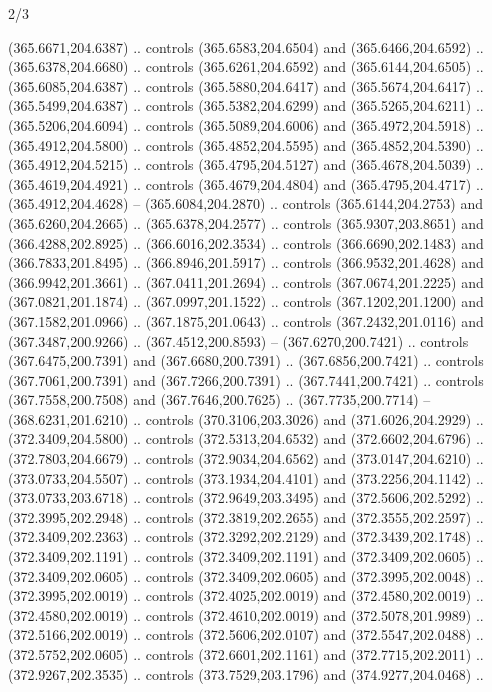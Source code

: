 \begin{flagdescription}{2/3}
\begin{scope}[xshift=0.5\flaglength,yshift=0.5\flagwidth,scale=\flagwidth/495.65]
\begin{scope}[y=0.8pt, x=0.8pt, yscale=-1,shift={(-463.76,-309.78)}]
  (365.6671,204.6387) .. controls (365.6583,204.6504) and (365.6466,204.6592) ..
  (365.6378,204.6680) .. controls (365.6261,204.6592) and (365.6144,204.6505) ..
  (365.6085,204.6387) .. controls (365.5880,204.6417) and (365.5674,204.6417) ..
  (365.5499,204.6387) .. controls (365.5382,204.6299) and (365.5265,204.6211) ..
  (365.5206,204.6094) .. controls (365.5089,204.6006) and (365.4972,204.5918) ..
  (365.4912,204.5800) .. controls (365.4852,204.5595) and (365.4852,204.5390) ..
  (365.4912,204.5215) .. controls (365.4795,204.5127) and (365.4678,204.5039) ..
  (365.4619,204.4921) .. controls (365.4679,204.4804) and (365.4795,204.4717) ..
  (365.4912,204.4628) -- (365.6084,204.2870) .. controls (365.6144,204.2753) and
  (365.6260,204.2665) .. (365.6378,204.2577) .. controls (365.9307,203.8651) and
  (366.4288,202.8925) .. (366.6016,202.3534) .. controls (366.6690,202.1483) and
  (366.7833,201.8495) .. (366.8946,201.5917) .. controls (366.9532,201.4628) and
  (366.9942,201.3661) .. (367.0411,201.2694) .. controls (367.0674,201.2225) and
  (367.0821,201.1874) .. (367.0997,201.1522) .. controls (367.1202,201.1200) and
  (367.1582,201.0966) .. (367.1875,201.0643) .. controls (367.2432,201.0116) and
  (367.3487,200.9266) .. (367.4512,200.8593) -- (367.6270,200.7421) .. controls
  (367.6475,200.7391) and (367.6680,200.7391) .. (367.6856,200.7421) .. controls
  (367.7061,200.7391) and (367.7266,200.7391) .. (367.7441,200.7421) .. controls
  (367.7558,200.7508) and (367.7646,200.7625) .. (367.7735,200.7714) --
  (368.6231,201.6210) .. controls (370.3106,203.3026) and (371.6026,204.2929) ..
  (372.3409,204.5800) .. controls (372.5313,204.6532) and (372.6602,204.6796) ..
  (372.7803,204.6679) .. controls (372.9034,204.6562) and (373.0147,204.6210) ..
  (373.0733,204.5507) .. controls (373.1934,204.4101) and (373.2256,204.1142) ..
  (373.0733,203.6718) .. controls (372.9649,203.3495) and (372.5606,202.5292) ..
  (372.3995,202.2948) .. controls (372.3819,202.2655) and (372.3555,202.2597) ..
  (372.3409,202.2363) .. controls (372.3292,202.2129) and (372.3439,202.1748) ..
  (372.3409,202.1191) .. controls (372.3409,202.1191) and (372.3409,202.0605) ..
  (372.3409,202.0605) .. controls (372.3409,202.0605) and (372.3995,202.0048) ..
  (372.3995,202.0019) .. controls (372.4025,202.0019) and (372.4580,202.0019) ..
  (372.4580,202.0019) .. controls (372.4610,202.0019) and (372.5078,201.9989) ..
  (372.5166,202.0019) .. controls (372.5606,202.0107) and (372.5547,202.0488) ..
  (372.5752,202.0605) .. controls (372.6601,202.1161) and (372.7715,202.2011) ..
  (372.9267,202.3535) .. controls (373.7529,203.1796) and (374.9277,204.0468) ..

\end{scope}
\end{scope}
\end{flagdescription}
